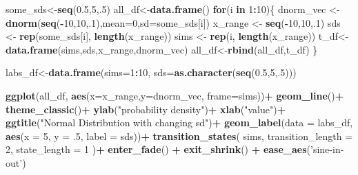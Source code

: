 \documentclass[
]{book}
\newenvironment{Shaded}{\begin{snugshade}}{\end{snugshade}}
\newcommand{\ControlFlowTok}[1]{\textcolor[rgb]{0.13,0.29,0.53}{\textbf{#1}}}
\newcommand{\DataTypeTok}[1]{\textcolor[rgb]{0.13,0.29,0.53}{#1}}
\newcommand{\DecValTok}[1]{\textcolor[rgb]{0.00,0.00,0.81}{#1}}
\newcommand{\FloatTok}[1]{\textcolor[rgb]{0.00,0.00,0.81}{#1}}
\newcommand{\KeywordTok}[1]{\textcolor[rgb]{0.13,0.29,0.53}{\textbf{#1}}}
\newcommand{\NormalTok}[1]{#1}
\newcommand{\OperatorTok}[1]{\textcolor[rgb]{0.81,0.36,0.00}{\textbf{#1}}}
\newcommand{\StringTok}[1]{\textcolor[rgb]{0.31,0.60,0.02}{#1}}
\begin{document}
\begin{Shaded}
\begin{Highlighting}[]
\NormalTok{some_sds<-}\KeywordTok{seq}\NormalTok{(}\FloatTok{0.5}\NormalTok{,}\DecValTok{5}\NormalTok{,.}\DecValTok{5}\NormalTok{)}
\NormalTok{all_df<-}\KeywordTok{data.frame}\NormalTok{()}
\ControlFlowTok{for}\NormalTok{(i }\ControlFlowTok{in} \DecValTok{1}\OperatorTok{:}\DecValTok{10}\NormalTok{)\{}
\NormalTok{  dnorm_vec <-}\StringTok{ }\KeywordTok{dnorm}\NormalTok{(}\KeywordTok{seq}\NormalTok{(}\OperatorTok{-}\DecValTok{10}\NormalTok{,}\DecValTok{10}\NormalTok{,.}\DecValTok{1}\NormalTok{),}\DataTypeTok{mean=}\DecValTok{0}\NormalTok{,}\DataTypeTok{sd=}\NormalTok{some_sds[i])}
\NormalTok{  x_range   <-}\StringTok{ }\KeywordTok{seq}\NormalTok{(}\OperatorTok{-}\DecValTok{10}\NormalTok{,}\DecValTok{10}\NormalTok{,.}\DecValTok{1}\NormalTok{)}
\NormalTok{  sds <-}\StringTok{ }\KeywordTok{rep}\NormalTok{(some_sds[i], }\KeywordTok{length}\NormalTok{(x_range))}
\NormalTok{  sims <-}\StringTok{ }\KeywordTok{rep}\NormalTok{(i, }\KeywordTok{length}\NormalTok{(x_range))}
\NormalTok{  t_df<-}\KeywordTok{data.frame}\NormalTok{(sims,sds,x_range,dnorm_vec)}
\NormalTok{  all_df<-}\KeywordTok{rbind}\NormalTok{(all_df,t_df)}
\NormalTok{\}}

\NormalTok{labs_df<-}\KeywordTok{data.frame}\NormalTok{(}\DataTypeTok{sims=}\DecValTok{1}\OperatorTok{:}\DecValTok{10}\NormalTok{,}
                    \DataTypeTok{sds=}\KeywordTok{as.character}\NormalTok{(}\KeywordTok{seq}\NormalTok{(}\FloatTok{0.5}\NormalTok{,}\DecValTok{5}\NormalTok{,.}\DecValTok{5}\NormalTok{)))}

\KeywordTok{ggplot}\NormalTok{(all_df, }\KeywordTok{aes}\NormalTok{(}\DataTypeTok{x=}\NormalTok{x_range,}\DataTypeTok{y=}\NormalTok{dnorm_vec, }\DataTypeTok{frame=}\NormalTok{sims))}\OperatorTok{+}
\StringTok{  }\KeywordTok{geom_line}\NormalTok{()}\OperatorTok{+}
\StringTok{  }\KeywordTok{theme_classic}\NormalTok{()}\OperatorTok{+}
\StringTok{  }\KeywordTok{ylab}\NormalTok{(}\StringTok{"probability density"}\NormalTok{)}\OperatorTok{+}
\StringTok{  }\KeywordTok{xlab}\NormalTok{(}\StringTok{"value"}\NormalTok{)}\OperatorTok{+}
\StringTok{  }\KeywordTok{ggtitle}\NormalTok{(}\StringTok{"Normal Distribution with changing sd"}\NormalTok{)}\OperatorTok{+}
\StringTok{  }\KeywordTok{geom_label}\NormalTok{(}\DataTypeTok{data =}\NormalTok{ labs_df, }\KeywordTok{aes}\NormalTok{(}\DataTypeTok{x =} \DecValTok{5}\NormalTok{, }\DataTypeTok{y =} \FloatTok{.5}\NormalTok{, }\DataTypeTok{label =}\NormalTok{ sds))}\OperatorTok{+}
\StringTok{   }\KeywordTok{transition_states}\NormalTok{(}
\NormalTok{    sims,}
    \DataTypeTok{transition_length =} \DecValTok{2}\NormalTok{,}
    \DataTypeTok{state_length =} \DecValTok{1}
\NormalTok{  )}\OperatorTok{+}
\StringTok{  }\KeywordTok{enter_fade}\NormalTok{() }\OperatorTok{+}\StringTok{ }
\StringTok{  }\KeywordTok{exit_shrink}\NormalTok{() }\OperatorTok{+}
\StringTok{  }\KeywordTok{ease_aes}\NormalTok{(}\StringTok{'sine-in-out'}\NormalTok{)}
\end{Highlighting}
\end{Shaded}

  
\end{document}
